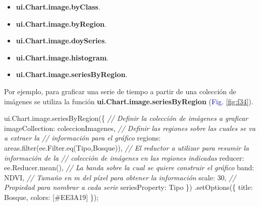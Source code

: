 \documentclass[
  12pt,
  letterpaper,
  twoside]{book}
\newenvironment{Shaded}{\begin{snugshade}}{\end{snugshade}}
\newcommand{\AttributeTok}[1]{\textcolor[rgb]{0.48,0.12,0.64}{#1}}
\newcommand{\CommentTok}[1]{\textcolor[rgb]{0.24,0.58,0.00}{\textit{#1}}}
\newcommand{\DataTypeTok}[1]{\textcolor[rgb]{0.00,0.00,0.00}{#1}}
\newcommand{\DecValTok}[1]{\textcolor[rgb]{0.28,0.53,0.93}{#1}}
\newcommand{\FunctionTok}[1]{\textcolor[rgb]{0.48,0.12,0.64}{#1}}
\newcommand{\NormalTok}[1]{#1}
\newcommand{\OperatorTok}[1]{\textcolor[rgb]{0.00,0.00,0.00}{#1}}
\newcommand{\StringTok}[1]{\textcolor[rgb]{0.87,0.29,0.22}{#1}}
\providecommand{\tightlist}{%
  \setlength{\itemsep}{0pt}\setlength{\parskip}{0pt}}
\newcommand\boldpurple[1]{\textcolor{darkpurple}{\textbf{#1}}}
\begin{document}
\begin{itemize}
\tightlist
\item
  \boldpurple{ui.Chart.image.byClass}.
\item
  \boldpurple{ui.Chart.image.byRegion}.
\item
  \boldpurple{ui.Chart.image.doySeries}.
\item
  \boldpurple{ui.Chart.image.histogram}.
\item
  \boldpurple{ui.Chart.image.seriesByRegion}.
\end{itemize}

Por ejemplo, para graficar una serie de tiempo a partir de una colección de imágenes se utiliza la función \boldpurple{ui.Chart.image.seriesByRegion} (\textcolor{darkblue}{Fig.} \ref{fig:f34}).

\begin{Shaded}
\begin{Highlighting}[]
\NormalTok{ui}\OperatorTok{.}\AttributeTok{Chart}\OperatorTok{.}\AttributeTok{image}\OperatorTok{.}\FunctionTok{seriesByRegion}\NormalTok{(\{}
  \CommentTok{// Definir la colección de imágenes a graficar}
  \DataTypeTok{imageCollection}\OperatorTok{:}\NormalTok{ coleccionImagenes}\OperatorTok{,} 
  \CommentTok{// Definir las regiones sobre las cuales se va a extraer la}
  \CommentTok{// información para el gráfico}
  \DataTypeTok{regions}\OperatorTok{:}\NormalTok{ areas}\OperatorTok{.}\FunctionTok{filter}\NormalTok{(ee}\OperatorTok{.}\AttributeTok{Filter}\OperatorTok{.}\FunctionTok{eq}\NormalTok{(}\StringTok{\textquotesingle{}Tipo\textquotesingle{}}\OperatorTok{,}\StringTok{\textquotesingle{}Bosque\textquotesingle{}}\NormalTok{))}\OperatorTok{,}
  \CommentTok{// El reductor a utilizar para resumir la información de la}
  \CommentTok{// colección de imágenes en las regiones indicadas}
  \DataTypeTok{reducer}\OperatorTok{:}\NormalTok{ ee}\OperatorTok{.}\AttributeTok{Reducer}\OperatorTok{.}\FunctionTok{mean}\NormalTok{()}\OperatorTok{,} 
  \CommentTok{// La banda sobre la cual se quiere construir el gráfico}
  \DataTypeTok{band}\OperatorTok{:} \StringTok{\textquotesingle{}NDVI\textquotesingle{}}\OperatorTok{,} 
  \CommentTok{// Tamaño en m del píxel para obtener la información}
  \DataTypeTok{scale}\OperatorTok{:} \DecValTok{30}\OperatorTok{,} 
  \CommentTok{// Propiedad para nombrar a cada serie}
  \DataTypeTok{seriesProperty}\OperatorTok{:} \StringTok{\textquotesingle{}Tipo\textquotesingle{}}
\NormalTok{\})}
  \OperatorTok{.}\FunctionTok{setOptions}\NormalTok{(\{}
    \DataTypeTok{title}\OperatorTok{:} \StringTok{\textquotesingle{}Bosque\textquotesingle{}}\OperatorTok{,}
    \DataTypeTok{colors}\OperatorTok{:}\NormalTok{ [}\StringTok{\textquotesingle{}\#EE3A19\textquotesingle{}}\NormalTok{]}
\NormalTok{  \})}\OperatorTok{;}
\end{Highlighting}
\end{Shaded}
\end{document}
